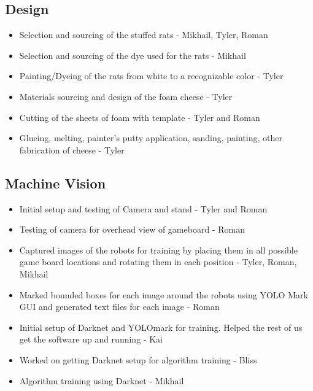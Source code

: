 \documentclass[a4paper,12pt]{article}
\begin{document}
\subsection{Design}
	\begin{itemize}	
		\item Selection and sourcing of the stuffed rats - Mikhail, Tyler, Roman
		\item Selection and sourcing of the dye used for the rats - Mikhail
		\item Painting/Dyeing of the rats from white to a recognizable color - Tyler
		\item Materials sourcing and design of the foam cheese - Tyler
		\item Cutting of the sheets of foam with template - Tyler and Roman
		\item Glueing, melting, painter’s putty application, sanding, painting, other fabrication of cheese - Tyler
	\end{itemize}

\subsection{Machine Vision}
	\begin{itemize}
		\item Initial setup and testing of Camera and stand - Tyler and Roman
		\item Testing of camera for overhead view of gameboard - Roman
		\item Captured images of the robots for training by placing them in all possible game board locations and rotating them in each position - Tyler, Roman, Mikhail
		\item Marked bounded boxes for each image around the robots using YOLO Mark GUI and generated text files for each image  - Roman
		\item Initial setup of Darknet and YOLOmark for training. Helped the rest of us get the software up and running - Kai
		\item Worked on getting Darknet setup for algorithm training - Bliss
		\item Algorithm training using Darknet - Mikhail
	\end{itemize}
	
\end{document}
